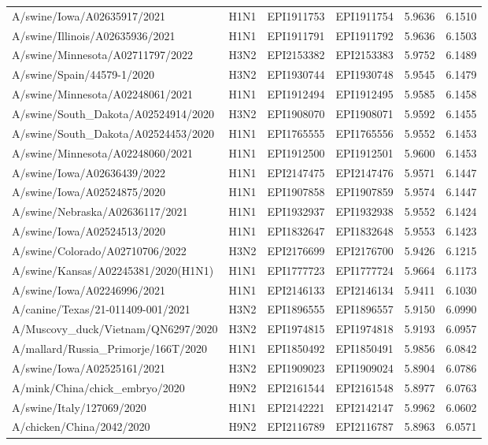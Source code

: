 \begin{tabular}{L{1.95in}|L{.25in}|L{.60in}|L{.6in}|C{1in}|C{1in}}
 A/swine/Iowa/A02635917/2021 &H1N1&EPI1911753&EPI1911754&5.9636&6.1510\\
 A/swine/Illinois/A02635936/2021 &H1N1&EPI1911791&EPI1911792&5.9636&6.1503\\
 A/swine/Minnesota/A02711797/2022 &H3N2&EPI2153382&EPI2153383&5.9752&6.1489\\
 A/swine/Spain/44579-1/2020 &H3N2&EPI1930744&EPI1930748&5.9545&6.1479\\
 A/swine/Minnesota/A02248061/2021 &H1N1&EPI1912494&EPI1912495&5.9585&6.1458\\
 A/swine/South\_Dakota/A02524914/2020 &H3N2&EPI1908070&EPI1908071&5.9592&6.1455\\
 A/swine/South\_Dakota/A02524453/2020 &H1N1&EPI1765555&EPI1765556&5.9552&6.1453\\
 A/swine/Minnesota/A02248060/2021 &H1N1&EPI1912500&EPI1912501&5.9600&6.1453\\
 A/swine/Iowa/A02636439/2022 &H1N1&EPI2147475&EPI2147476&5.9571&6.1447\\
 A/swine/Iowa/A02524875/2020 &H1N1&EPI1907858&EPI1907859&5.9574&6.1447\\
 A/swine/Nebraska/A02636117/2021 &H1N1&EPI1932937&EPI1932938&5.9552&6.1424\\
 A/swine/Iowa/A02524513/2020 &H1N1&EPI1832647&EPI1832648&5.9553&6.1423\\
 A/swine/Colorado/A02710706/2022 &H3N2&EPI2176699&EPI2176700&5.9426&6.1215\\
 A/swine/Kansas/A02245381/2020(H1N1) &H1N1&EPI1777723&EPI1777724&5.9664&6.1173\\
 A/swine/Iowa/A02246996/2021 &H1N1&EPI2146133&EPI2146134&5.9411&6.1030\\
 A/canine/Texas/21-011409-001/2021 &H3N2&EPI1896555&EPI1896557&5.9150&6.0990\\
 A/Muscovy\_duck/Vietnam/QN6297/2020 &H3N2&EPI1974815&EPI1974818&5.9193&6.0957\\
 A/mallard/Russia\_Primorje/166T/2020 &H1N1&EPI1850492&EPI1850491&5.9856&6.0842\\
 A/swine/Iowa/A02525161/2021 &H3N2&EPI1909023&EPI1909024&5.8904&6.0786\\
 A/mink/China/chick\_embryo/2020 &H9N2&EPI2161544&EPI2161548&5.8977&6.0763\\
 A/swine/Italy/127069/2020 &H1N1&EPI2142221&EPI2142147&5.9962&6.0602\\
 A/chicken/China/2042/2020 &H9N2&EPI2116789&EPI2116787&5.8963&6.0571\\
\hline\end{tabular}
